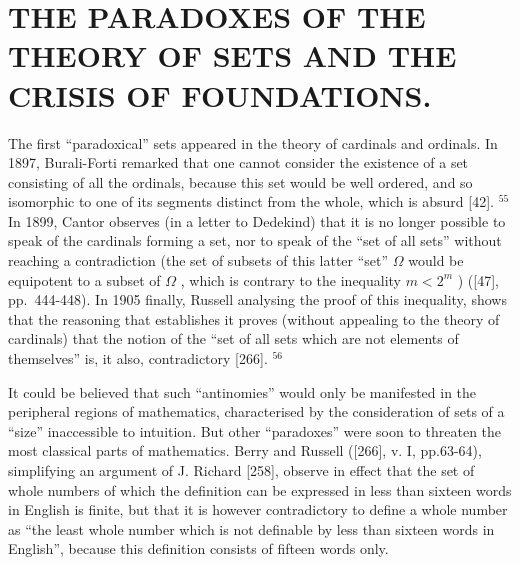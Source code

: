 \section*{THE PARADOXES OF THE THEORY OF SETS AND THE CRISIS OF FOUNDATIONS.}
{}

The first ``paradoxical'' sets appeared in the theory of cardinals and ordinals. In 1897, Burali-Forti remarked that one cannot consider the existence of a set consisting of all the ordinals, because this set would be well ordered, and so isomorphic to one of its segments distinct from the whole, which is absurd {[}42{]}. \(^{55}\) In 1899, Cantor observes (in a letter to Dedekind) that it is no longer possible to speak of the cardinals forming a set, nor to speak of the ``set of all sets'' without reaching a contradiction (the set of subsets of this latter ``set'' \(\Omega\) would be equipotent to a subset of \(\Omega\) , which is contrary to the inequality \(m < 2^{m}\) ) ({[}47{]}, pp.~444-448). In 1905 finally, Russell analysing the proof of this inequality, shows that the reasoning that establishes it proves (without appealing to the theory of cardinals) that the notion of the ``set of all sets which are not elements of themselves'' is, it also, contradictory {[}266{]}. \(^{56}\)

It could be believed that such ``antinomies'' would only be manifested in the peripheral regions of mathematics, characterised by the consideration of sets of a ``size'' inaccessible to intuition. But other ``paradoxes'' were soon to threaten the most classical parts of mathematics. Berry and Russell ({[}266{]}, v. I, pp.63-64), simplifying an argument of J. Richard {[}258{]}, observe in effect that the set of whole numbers of which the definition can be expressed in less than sixteen words in English is finite, but that it is however contradictory to define a whole number as ``the least whole number which is not definable by less than sixteen words in English'', because this definition consists of fifteen words only.

